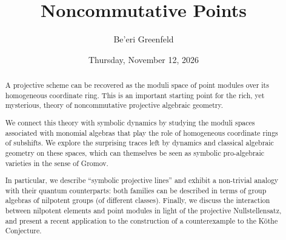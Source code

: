 \documentclass{UAmathtalk}
\author{Be'eri Greenfeld}
\title{Noncommutative Points}
\date{Thursday, November 12, 2026}
\begin{document}
\maketitle

\begin{abstract}
A projective scheme can be recovered as the moduli space of point modules over its homogeneous coordinate ring. This is an important starting point for the rich, yet mysterious, theory of noncommutative projective algebraic geometry.

We connect this theory with symbolic dynamics by studying the moduli spaces associated with monomial algebras that play the role of homogeneous coordinate rings of subshifts. We explore the surprising traces left by dynamics and classical algebraic geometry on these spaces, which can themselves be seen as symbolic pro-algebraic varieties in the sense of Gromov.

In particular, we describe “symbolic projective lines” and exhibit a non-trivial analogy with their quantum counterparts: both families can be described in terms of group algebras of nilpotent groups (of different classes). Finally, we discuss the interaction between nilpotent elements and point modules in light of the projective Nullstellensatz, and present a recent application to the construction of a counterexample to the Köthe Conjecture.
\end{abstract}
\end{document}
